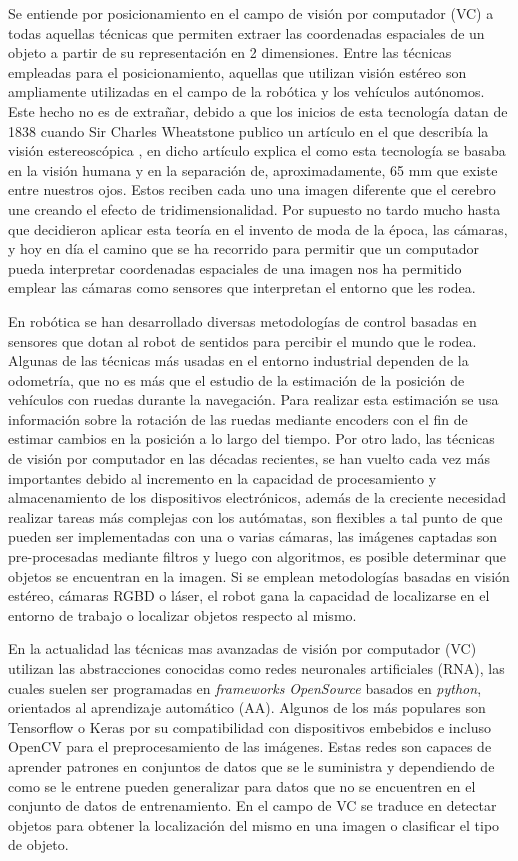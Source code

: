Se entiende por posicionamiento en el campo de visión por computador (VC) a todas aquellas técnicas que permiten extraer las coordenadas espaciales de un objeto a partir de su representación en 2 dimensiones. Entre las técnicas empleadas para el posicionamiento, aquellas que utilizan visión estéreo son ampliamente utilizadas en el campo de la robótica y los vehículos autónomos. Este hecho no es de extrañar, debido a que los inicios de esta tecnología datan de 1838 cuando Sir Charles Wheatstone publico un artículo en el que describía la visión estereoscópica \cite{Wheatstone1837}, en dicho artículo explica el como esta tecnología se basaba en la visión humana y en la separación de, aproximadamente, 65 mm que existe entre nuestros ojos. Estos reciben cada uno una imagen diferente que el cerebro une creando el efecto de tridimensionalidad. Por supuesto no tardo mucho hasta que decidieron aplicar esta teoría en el invento de moda de la época, las cámaras, y hoy en día el camino que se ha recorrido para permitir que un computador pueda interpretar coordenadas espaciales de una imagen nos ha permitido emplear las cámaras como sensores que interpretan el entorno que les rodea. 

En robótica se han desarrollado diversas metodologías de control basadas en sensores que dotan al robot de sentidos para percibir el mundo que le rodea. Algunas de las técnicas más usadas en el entorno industrial dependen de la odometría, que no es más que el estudio de la estimación de la posición de vehículos con ruedas durante la navegación. Para realizar esta estimación se usa información sobre la rotación de las ruedas mediante encoders con el fin de estimar cambios en la posición a lo largo del tiempo. Por otro lado, las técnicas de visión por computador en las décadas recientes, se han vuelto cada vez más importantes debido al incremento en la capacidad de procesamiento y almacenamiento de los dispositivos electrónicos, además de la creciente necesidad realizar tareas más complejas con los autómatas, son flexibles a tal punto de que pueden ser implementadas con una o varias cámaras, las imágenes captadas son pre-procesadas mediante filtros y luego con algoritmos, es posible determinar que objetos se encuentran en la imagen. Si se emplean metodologías basadas en visión estéreo, cámaras RGBD o láser, el robot gana la capacidad de localizarse en el entorno de trabajo o localizar objetos respecto al mismo.

En la actualidad las técnicas mas avanzadas de visión por computador (VC) utilizan las abstracciones conocidas como redes neuronales artificiales (RNA), las cuales suelen ser programadas en \textit{frameworks OpenSource} basados en \textit{python}, orientados al aprendizaje automático (AA). Algunos de los más populares son Tensorflow o Keras por su compatibilidad con dispositivos embebidos e incluso OpenCV para el preprocesamiento de las imágenes. Estas redes son capaces de aprender patrones en conjuntos de datos que se le suministra y dependiendo de como se le entrene pueden generalizar para datos que no se encuentren en el conjunto de datos de entrenamiento. En el campo de VC se traduce en detectar objetos para obtener la localización del mismo en una imagen o clasificar el tipo de objeto.

